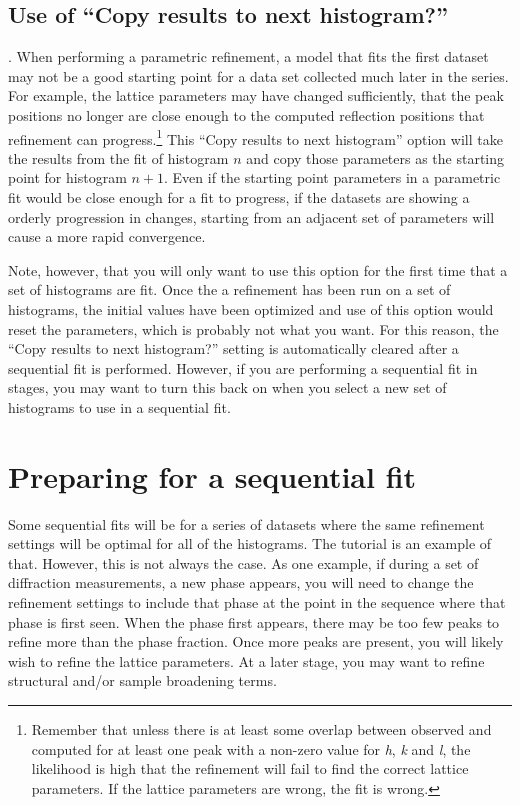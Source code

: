 \subsection{Use of ``Copy results to next histogram?''}\label{ref:copynext}.
When performing a parametric refinement, a model that fits the first dataset may not be a good starting point for a data set collected much later in the series. For example, the lattice parameters may have changed sufficiently, that the peak positions no longer are close enough to the computed reflection positions that refinement can progress.\footnote{Remember that unless there is at least some overlap between observed and computed for at least one peak with a non-zero value for \textit{h}, \textit{k} and \textit{l}, the likelihood is high that the refinement will fail to find the correct lattice parameters. If the lattice parameters are wrong, the fit is wrong.} This ``Copy results to next histogram'' option will take the results from the fit of histogram $n$ and copy those parameters as the starting point for histogram $n+1$. Even if the starting point parameters in a parametric fit would be close enough for a fit to progress, if the datasets are showing a orderly progression in changes, starting from an adjacent set of parameters will cause a more rapid convergence. 

Note, however, that you will only want to use this option for the first time that a set of histograms are fit. Once the a refinement has been run on a set of histograms, the initial values have been optimized and use of this option would reset the parameters, which is probably not what you want. For this reason, the ``Copy results to next histogram?'' setting is automatically cleared after a sequential fit is performed. However, if you are performing a sequential fit in stages, you may want to turn this back on when you select a new set of histograms to use in a sequential fit.


\section{Preparing for a sequential fit}
Some sequential fits will be for a series of datasets where the same refinement settings will be optimal for all of the histograms. The tutorial is an example of that. However, this is not always the case. As one example, if during a set of diffraction measurements, a new phase appears, you will need to change the refinement settings to include that phase at the point in the sequence where that phase is first seen. When the phase first appears, there may be too few peaks to refine more than the phase fraction. Once more peaks are present, you will likely wish to refine the lattice parameters. At a later stage, you may want to refine structural and/or sample broadening terms. 

